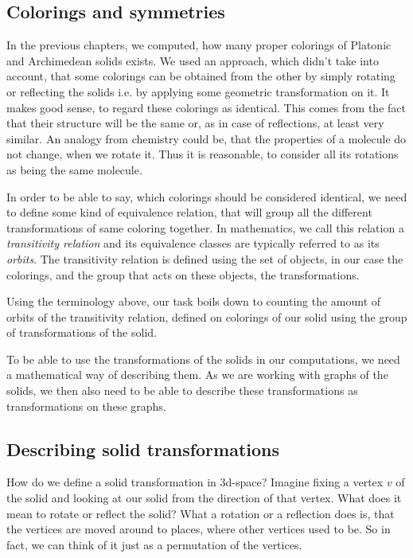 \begin{highlight}

\chapter{Colorings and symmetries}

In the previous chapters, we computed, how many proper colorings of Platonic and Archimedean solids exists. We used an approach, which didn't take into account, that some colorings can be obtained from the other by simply rotating or reflecting the solids i.e. by applying some geometric transformation on it. It makes good sense, to regard these colorings as identical. This comes from the fact that their structure will be the same or, as in case of reflections, at least very similar. An analogy from chemistry could be, that the properties of a molecule do not change, when we rotate it. Thus it is reasonable, to consider all its rotations as being the same molecule. 

In order to be able to say, which colorings should be considered identical, we need to define some kind of equivalence relation, that will group all the different transformations of same coloring together. In mathematics, we call this relation a \textit{transitivity relation} and its equivalence classes are typically referred to as its \textit{orbits}. The transitivity relation is defined using the set of objects, in our case the colorings, and the group that acts on these objects, the transformations.

Using the terminology above, our task boils down to counting the amount of orbits of the transitivity relation, defined on colorings of our solid using the group of transformations of the solid.

To be able to use the transformations of the solids in our computations, we need a mathematical way of describing them. As we are working with graphs of the solids, we then also need to be able to describe these transformations as transformations on these graphs.

\section{Describing solid transformations}

How do we define a solid transformation in 3d-space? Imagine fixing a vertex $v$ of the solid and looking at our solid from the direction of that vertex. What does it mean to rotate or reflect the solid? What a rotation or a reflection does is, that the vertices are moved around to places, where other vertices used to be. So in fact, we can think of it just as a permutation of the vertices. 


\end{highlight}

